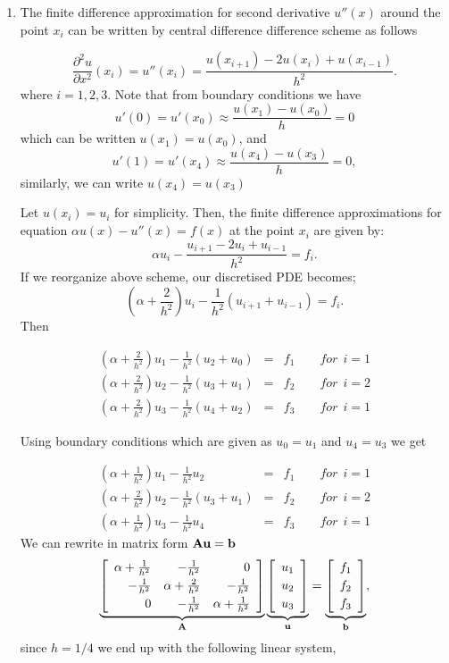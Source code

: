 \begin{solution}
\begin{enumerate}
\item The finite difference approximation for second derivative $u''(x)$ around the point $x_i$ can be written by central difference difference scheme as follows
 
\[
\frac{\partial^2 u}{\partial x^2}(x_i)=u''(x_i)=\frac{u(x_{i+1}) - 2u(x_i) + u(x_{i-1})}{h^2}.
\] where $i=1,2,3$.
Note that from boundary conditions we have 
\[
u'(0) = u'(x_0) \approx \frac{u(x_1)-u(x_0)}{h} = 0
\] which can be written $u(x_1)=u(x_0)$, and
\[
u'(1) = u'(x_{4}) \approx \frac{u(x_{4})-u(x_3)}{h} = 0,
\] similarly, we can write $u(x_{4})=u(x_3)$

Let $u(x_i)=u_i$ for simplicity. Then, the finite difference approximations for equation $\alpha u(x)-u''(x)=f(x)$ at the point $x_i$ are given by:
\[\alpha u_i-\frac{u_{i+1} - 2u_i + u_{i-1}}{h^2}=f_i.\] If we reorganize above scheme, our discretised PDE becomes;
\[(\alpha+\frac{2}{h^2}) u_i -\frac{1}{h^2}(u_{i+1} + u_{i-1})=f_i.\] Then 

\begin{eqnarray*}
(\alpha+\frac{2}{h^2}) u_1 -\frac{1}{h^2}(u_{2} + u_{0})&=&f_1 \qquad for \:\: i=1\\
(\alpha+\frac{2}{h^2}) u_2 -\frac{1}{h^2}(u_{3} + u_{1})&=&f_2 \qquad for \:\: i=2\\
(\alpha+\frac{2}{h^2}) u_3 -\frac{1}{h^2}(u_{4} + u_{2})&=&f_3 \qquad for \:\: i=1
\end{eqnarray*}

Using boundary conditions which are given as $u_0=u_1$ and $u_4=u_3$ we get 

\begin{eqnarray*}
(\alpha+\frac{1}{h^2}) u_1 -\frac{1}{h^2}u_{2}&=&f_1 \qquad for \:\: i=1\\
(\alpha+\frac{2}{h^2}) u_2 -\frac{1}{h^2}(u_{3} + u_{1})&=&f_2 \qquad for \:\: i=2\\
(\alpha+\frac{1}{h^2}) u_3 -\frac{1}{h^2}u_{4}&=&f_3 \qquad for \:\: i=1
\end{eqnarray*}
We can rewrite in matrix form ${\bf A}{\bf u} = {\bf b}$
\[
  \underbrace{\left[\begin{array}{rrr}
              \alpha+\frac{1}{h^2} & -\frac{1}{h^2}&0 \\[0.25em]
               -\frac{1}{h^2} & \alpha+\frac{2}{h^2} &  -\frac{1}{h^2}  \\[0.25em]
                 0 &   -\frac{1}{h^2}   & \alpha+\frac{1}{h^2} 
               \end{array}\right]}_{\bf A}
          \underbrace{\left[\begin{array}{c} u_1 \\[0.25em] u_2 \\[0.25em] u_{3} \end{array}\right]}_{\bf u}
 =   \underbrace{\left[\begin{array}{c} f_1 \\[0.25em] f_2 \\[0.25em] f_3  \end{array}\right]}_{\bf b},
\] since $h=1/4$ we end up with the following linear system,


\end{enumerate}
\end{solution}
